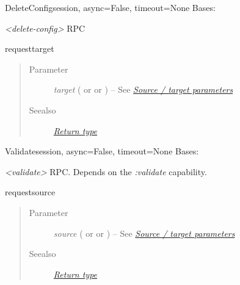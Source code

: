 \documentclass[a4paper,10pt,english]{manual}
\begin{document}
\hypertarget{ncclient.operations.DeleteConfig}{}\begin{classdesc}{DeleteConfig}{session, async=False, timeout=None}
Bases: \hyperlink{ncclient.operations.rpc.RPC}{}

\emph{\textless{}delete-config\textgreater{}} RPC

\hypertarget{ncclient.operations.DeleteConfig.request}{}\begin{methoddesc}{request}{target}~\begin{quote}\begin{description}
\item[Parameter]
\emph{target} (\href{http://docs.python.org/library/string.html\#string}{} or \href{http://docs.python.org/library/stdtypes.html\#dict}{} or \href{http://docs.python.org/library/xml.etree.elementtree.html\#xml.etree.ElementTree.Element}{}) -- See \hyperlink{source-target}{\emph{Source / target parameters}}

\item[Seealso]
\hyperlink{return}{\emph{Return type}}

\end{description}\end{quote}
\end{methoddesc}
\end{classdesc}

\hypertarget{ncclient.operations.Validate}{}\begin{classdesc}{Validate}{session, async=False, timeout=None}
Bases: \hyperlink{ncclient.operations.rpc.RPC}{}

\emph{\textless{}validate\textgreater{}} RPC. Depends on the \emph{:validate} capability.

\hypertarget{ncclient.operations.Validate.request}{}\begin{methoddesc}{request}{source}~\begin{quote}\begin{description}
\item[Parameter]
\emph{source} (\href{http://docs.python.org/library/string.html\#string}{} or \href{http://docs.python.org/library/stdtypes.html\#dict}{} or \href{http://docs.python.org/library/xml.etree.elementtree.html\#xml.etree.ElementTree.Element}{}) -- See \hyperlink{source-target}{\emph{Source / target parameters}}

\item[Seealso]
\hyperlink{return}{\emph{Return type}}

\end{description}\end{quote}
\end{methoddesc}
\end{classdesc}
\end{document}
